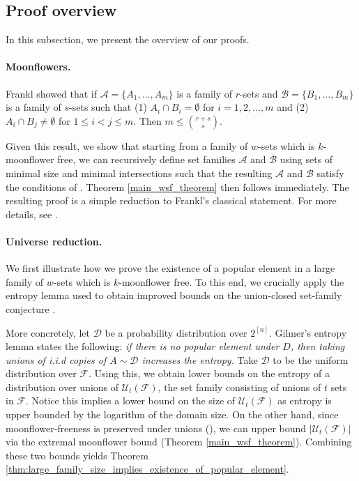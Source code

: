 \documentclass{article}
\newcommand{\<}{\langle}
\renewcommand{\>}{\rangle}
\newcommand{\calA}{\mathcal{A}}
\newcommand{\calB}{\mathcal{B}}
\newcommand{\calD}{\mathcal{D}}
\newcommand{\calF}{\mathcal{F}}
\newcommand{\calU}{\mathcal{U}}
\begin{document}
\subsection{Proof overview}
In this subsection, we present the overview of our proofs. 

\paragraph{Moonflowers.} Frankl \cite{Frankl1982ExtremalProblem} showed that if $\calA = \{A_1,...,A_m\}$ is a family of $r$-sets and $\calB = \{B_1,...,B_m\}$ is a family of $s$-sets such that (1) $A_i \cap B_i = \emptyset$ for $i = 1,2,...,m$ and (2) $A_i \cap B_j \neq \emptyset$ for $1 \leq i < j \leq m$. Then $m \leq \binom{r+s}{s}$.  

Given this result, we show that starting from a family of $w$-sets which is $k$-moonflower free, we can recursively define set families $\calA$ and $\calB$ using sets of minimal size and minimal intersections such that the resulting $\calA$ and $\calB$ satisfy the conditions of
\cite{Frankl1982ExtremalProblem}. Theorem \ref{main_wsf_theorem} then follows immediately. The resulting proof is a simple reduction to Frankl's classical statement. For more details, see . 

\paragraph{Universe reduction.} We first illustrate how we prove the existence of a popular element in a large family of $w$-sets which is $k$-moonflower free. To this end, we crucially apply the entropy lemma \cite{Gil22,Saw23} used to obtain improved bounds on the union-closed set-family conjecture \cite{frankl1995extremal}. 

More concretely, let $\calD$ be a probability distribution over $2^{[n]}$. Gilmer's entropy lemma states the following: \emph{if there is no popular element under $D$, then taking unions of i.i.d copies of $A \sim \calD$ increases the entropy.} Take $\calD$ to be the uniform distribution over $\calF$. Using this, we obtain lower bounds on the entropy of a distribution over unions of $\calU_t (\calF)$, the set family consisting of unions of $t$ sets in $\calF$. Notice this implies a lower bound on the size of $\calU_t (\calF)$ as entropy is upper bounded by the logarithm of the domain size. On the other hand,
since moonflower-freeness is preserved under unions (), we can upper bound $|\calU_t (\calF)|$ via the extremal moonflower bound (Theorem \ref{main_wsf_theorem}). Combining these two bounds yields Theorem \ref{thm:large_family_size_implies_existence_of_popular_element}.
\end{document}
